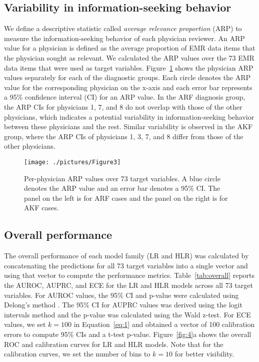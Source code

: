 \subsection{Variability in information-seeking behavior}\label{sec:variability}
We define a descriptive statistic called \textit{average relevance proportion} (ARP) to measure the information-seeking behavior of each physician reviewer. An ARP value for a physician is defined as the average proportion of EMR data items that the physician sought as relevant. We calculated the ARP values over the 73 EMR data items that were used as target variables. Figure~\ref{fig:3} shows the physician ARP values separately for each of the diagnostic groups. Each circle denotes the ARP value for the corresponding physician on the x-axis and each error bar represents a 95\% confidence interval (CI) for an ARP value. In the ARF diagnosis group, the ARP CIs for physicians 1, 7, and 8 do not overlap with those of the other physicians, which indicates a potential variability in information-seeking behavior between these physicians and the rest. Similar variability is observed in the AKF group, where the ARP CIs of physicians 1, 3, 7, and 8 differ from those of the other physicians.

\begin{figure}[!h]
    \centering
    \texttt{[image: ./pictures/Figure3]}
    \caption{
    Per-physician ARP values over 73 target variables. A blue circle denotes the ARP value and an error bar denotes a 95\% CI. The panel on the left is for ARF cases and the panel on the right is for AKF cases.
    }\label{fig:3}
\end{figure}

\subsection{Overall performance} \label{sec:overall_performance}
The overall performance of each model family (LR and HLR) was calculated by concatenating the predictions for all 73 target variables into a single vector and using that vector to compute the performance metrics. Table~\ref{tab:overall} reports the AUROC, AUPRC, and ECE for the LR and HLR models across all 73 target variables. For AUROC values, the 95\% CI and p-value were calculated using Delong’s method \cite{DeLong2003,Robin2011}. The 95\% CI for AUPRC values was derived using the logit intervals method \cite{Boyd2013} and the p-value was calculated using the Wald z-test. For ECE values, we set $k=100$ in Equation~\ref{eq:1} and obtained a vector of 100 calibration errors to compute 95\% CIs and a t-test p-value. Figure~\ref{fig:4}a shows the overall ROC and calibration curves for LR and HLR models. Note that for the calibration curves, we set the number of bins to $k=10$ for better visibility.

